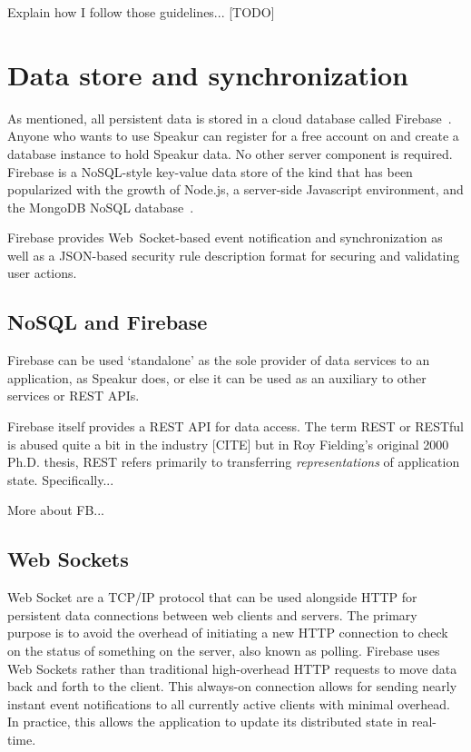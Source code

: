 Explain how I follow those guidelines... [TODO]

\section{Data store and synchronization}
As mentioned, all persistent data is stored in a cloud database called Firebase~\cite{firebasecontributors2015}.
Anyone who wants to use Speakur can register for a free account on  and create a database instance to hold Speakur data.
No other server component is required.
Firebase is a NoSQL-style key-value data store of the kind that has been popularized
with the growth of 
Node.js, a server-side Javascript environment,
and the MongoDB NoSQL database~\cite{dickey2014}.

Firebase provides Web~Socket-based event notification and synchronization 
as well as a JSON-based security rule description format for securing and validating user actions.

\subsection{NoSQL and Firebase}
Firebase can be used `standalone' as the sole provider of data services to an application, as Speakur does, or else it can be used as an auxiliary to other services or REST APIs.

Firebase itself provides a REST API for data access.
The term REST or RESTful is abused quite a bit in the industry [CITE]
but in Roy Fielding's original 2000 Ph.D. thesis, 
REST refers primarily to transferring \textit{representations} of application state.
Specifically...

More about FB...


\subsection{Web Sockets}
Web Socket are a TCP/IP protocol that can be used alongside HTTP for persistent data connections between web clients and servers.
The primary purpose is to avoid the overhead of initiating a new HTTP connection to check on the status of something on the server, also known as polling.
Firebase uses Web Sockets rather than traditional high-overhead HTTP requests to move data back and forth to the client.
This always-on connection allows for sending nearly instant event notifications to all currently active clients with minimal overhead.
In practice, this allows the application to update its distributed state in real-time.

